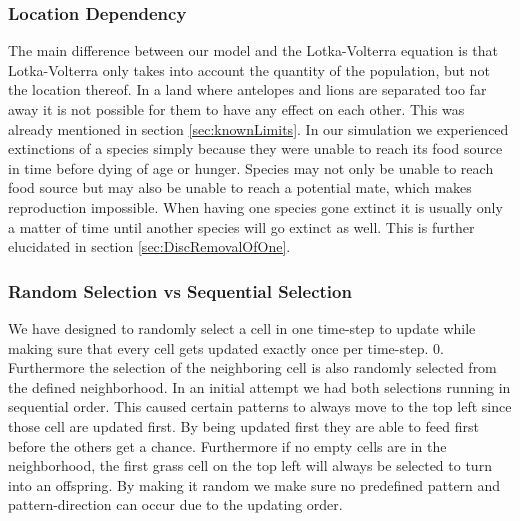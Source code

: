 \documentclass[11pt]{article}
\begin{document}
\subsubsection{Location Dependency}
\label{sec:DiscLocationDep}
The main difference between our model and the Lotka-Volterra equation is that Lotka-Volterra only takes into account the quantity of the population, but not the location thereof. In a land where antelopes and lions are separated too far away it is not possible for them to have any effect on each other. This was already mentioned in section \ref{sec:knownLimits}. In our simulation we experienced extinctions of a species simply because they were unable to reach its food source in time before dying of age or hunger. Species may not only be unable to reach food source but may also be unable to reach a potential mate, which makes reproduction impossible. When having one species gone extinct it is usually only a matter of time until another species will go extinct as well. This is further elucidated in section \ref{sec:DiscRemovalOfOne}.

\subsubsection{Random Selection vs Sequential Selection}
We have designed to randomly select a cell in one time-step to update while making sure that every cell gets updated exactly once per time-step. 0. Furthermore the selection of the neighboring cell is also randomly selected from the defined neighborhood. In an initial attempt we had both selections running in sequential order. This caused certain patterns to always move to the top left since those cell are updated first. By being updated first they are able to feed first before the others get a chance. Furthermore if no empty cells are in the neighborhood, the first grass cell on the top left will always be selected to turn into an offspring. By making it random we make sure no predefined pattern and pattern-direction can occur due to the updating order.
\end{document}
